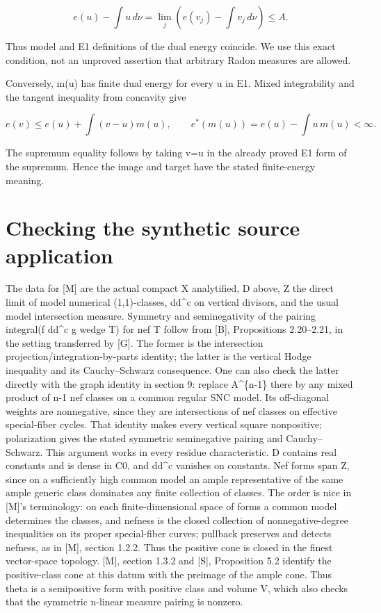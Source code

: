 \documentclass[11pt]{article}
\begin{document}
\[
e(u)-\int u\,d\nu=\lim_j\left(e(v_j)-\int v_j\,d\nu\right)\leq A.
\]

Thus model and E1 definitions of the dual energy coincide. We use this exact condition, not an unproved assertion that arbitrary Radon measures are allowed.

Conversely, m(u) has finite dual energy for every u in E1. Mixed integrability and the tangent inequality from concavity give

\[
e(v)\leq e(u)+\int(v-u)m(u),\qquad
e^*(m(u))=e(u)-\int u\,m(u)<\infty.
\]

The supremum equality follows by taking v=u in the already proved E1 form of the supremum. Hence the image and target have the stated finite-energy meaning.

\section{Checking the synthetic source application}

The data for [M] are the actual compact X analytified, D above, Z the direct limit of model numerical (1,1)-classes, dd\textasciicircum{}c on vertical divisors, and the usual model intersection measure. Symmetry and seminegativity of the pairing integral(f dd\textasciicircum{}c g wedge T) for nef T follow from [B], Propositions 2.20--2.21, in the setting transferred by [G]. The former is the intersection projection/integration-by-parts identity; the latter is the vertical Hodge inequality and its Cauchy--Schwarz consequence. One can also check the latter directly with the graph identity in section 9: replace A\textasciicircum{}\{n-1\} there by any mixed product of n-1 nef classes on a common regular SNC model. Its off-diagonal weights are nonnegative, since they are intersections of nef classes on effective special-fiber cycles. That identity makes every vertical square nonpositive; polarization gives the stated symmetric seminegative pairing and Cauchy--Schwarz. This argument works in every residue characteristic. D contains real constants and is dense in C0, and dd\textasciicircum{}c vanishes on constants. Nef forms span Z, since on a sufficiently high common model an ample representative of the same ample generic class dominates any finite collection of classes. The order is nice in [M]'s terminology: on each finite-dimensional space of forms a common model determines the classes, and nefness is the closed collection of nonnegative-degree inequalities on its proper special-fiber curves; pullback preserves and detects nefness, as in [M], section 1.2.2. Thus the positive cone is closed in the finest vector-space topology. [M], section 1.3.2 and [S], Proposition 5.2 identify the positive-class cone at this datum with the preimage of the ample cone. Thus theta is a semipositive form with positive class and volume V, which also checks that the symmetric n-linear measure pairing is nonzero.
\end{document}
